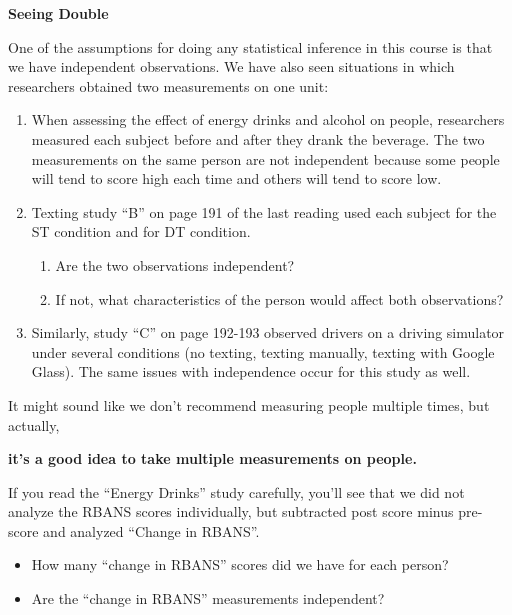 \def\theTopic{Reading 22 }

\begin{center}
{\bf {\large Seeing Double}}\\ 
\end{center}

One of the assumptions for doing any statistical inference in this
course is that we have independent observations.  
We have also seen situations in which researchers obtained two
measurements on one unit:
\begin{enumerate}
  \item  When assessing the effect of energy drinks and alcohol on
    people, researchers measured each subject before and after they
    drank the beverage.  The two measurements on the same person are
    not independent because some people will tend to score high each
    time and others will tend to score low.
  \item Texting study ``B'' on page 191 of the last reading used each
    subject for the ST  condition and for DT condition.  
    \begin{enumerate}
    \item Are the two  observations independent?\vspace{1cm}
    \item If not, what characteristics of the person would affect both
      observations? \vspace{1cm}
    \end{enumerate}
  \item Similarly, study ``C'' on page 192-193 observed drivers on a
    driving simulator under several conditions (no texting, texting
    manually, texting with Google Glass).  The same issues with
    independence occur for this study as well.
  \end{enumerate}

It might sound like we don't recommend measuring people multiple
times, but actually, \vspace{.4cm}

{\bf it's a good idea to take multiple measurements on people.}\vspace{.4cm}
  

If you read the ``Energy Drinks'' study carefully, you'll see that we
did not analyze the RBANS scores individually, but subtracted post
score minus pre-score and analyzed ``Change in RBANS''.
\begin{itemize}
\item How many ``change in RBANS'' scores did we have for each
  person?\vspace{.5cm}
\item Are the ``change in RBANS'' measurements independent?\vspace{.5cm}
\end{itemize}

